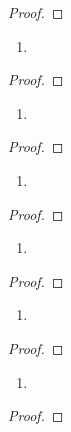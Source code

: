 \documentclass[12pt]{amsart}
\begin{document}
\begin{proof}
\end{proof}

\begin{enumerate}
  \item[16.] {
    }
\end{enumerate}

\begin{proof}
\end{proof}

\begin{enumerate}
  \item[17.] {
    }
\end{enumerate}

\begin{proof}
\end{proof}

\begin{enumerate}
  \item[18.] {
    }
\end{enumerate}

\begin{proof}
\end{proof}

\begin{enumerate}
  \item[19.] {
    }
\end{enumerate}

\begin{proof}
\end{proof}

\begin{enumerate}
  \item[20.] {
    }
\end{enumerate}

\begin{proof}
\end{proof}

\begin{enumerate}
  \item[21.] {
    }
\end{enumerate}

\begin{proof}
\end{proof}
\end{document}
